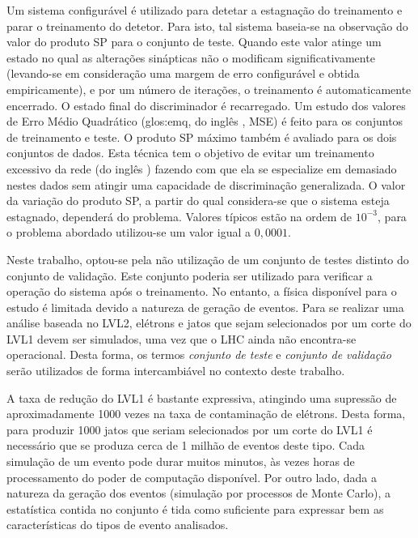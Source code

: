 Um sistema configurável é utilizado para detetar a estagnação do treinamento e
parar o treinamento do detetor. Para isto, tal sistema baseia-se na observação
do valor do produto SP para o conjunto de teste. Quando este valor atinge um
estado no qual as alterações sinápticas não o modificam significativamente
(levando-se em consideração uma margem de erro configurável e obtida
empiricamente), e por um número de iterações, o treinamento é automaticamente
encerrado. O estado final do discriminador é recarregado. Um estudo dos
valores de Erro Médio Quadrático (\gls{glos:emq}, do inglês , MSE) é feito para os conjuntos de treinamento e teste. O produto SP
máximo também é avaliado para os dois conjuntos de dados. Esta técnica tem o
objetivo de evitar um treinamento excessivo da rede (do inglês
) fazendo com que ela se especialize em demasiado nestes
dados sem atingir uma capacidade de discriminação generalizada. O valor da
variação do produto SP, a partir do qual considera-se que o sistema esteja
estagnado, dependerá do problema. Valores típicos estão na ordem de $10^{-3}$,
para o problema abordado utilizou-se um valor igual a $0,0001$.

Neste trabalho, optou-se pela não utilização de um conjunto de testes distinto
do conjunto de validação. Este conjunto poderia ser utilizado para verificar a
operação do sistema após o treinamento. No entanto, a física disponível para o
estudo é limitada devido a natureza de geração de eventos. Para se realizar
uma análise baseada no LVL2, elétrons e jatos que sejam selecionados por um
corte do LVL1 devem ser simulados, uma vez que o LHC ainda não encontra-se
operacional. Desta forma, os termos \textit{conjunto de teste} e
\textit{conjunto de validação} serão utilizados de forma intercambiável no
contexto deste trabalho.

A taxa de redução do LVL1 é bastante expressiva, atingindo uma supressão de
aproximadamente 1000 vezes na taxa de contaminação de elétrons. Desta forma,
para produzir 1000 jatos que seriam selecionados por um corte do LVL1 é
necessário que se produza cerca de 1 milhão de eventos deste tipo. Cada
simulação de um evento pode durar muitos minutos, às vezes horas de
processamento do poder de computação disponível. Por outro lado, dada a
natureza da geração dos eventos (simulação por processos de Monte Carlo), a
estatística contida no conjunto é tida como suficiente para expressar bem as
características do tipos de evento analisados.


